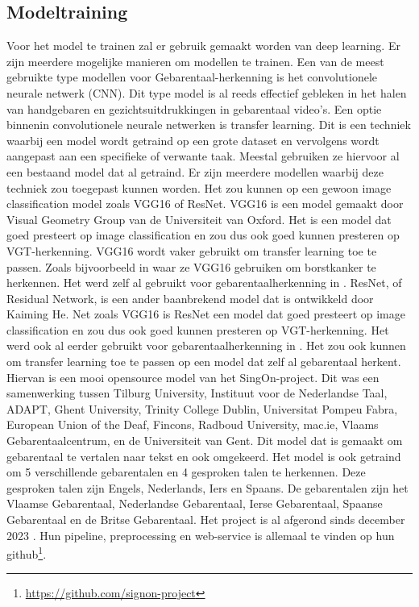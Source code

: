 \subsection{Modeltraining}
\label{subsec:modeltraining}
Voor het model te trainen zal er gebruik gemaakt worden van deep learning.
Er zijn meerdere mogelijke manieren om modellen te trainen. 
Een van de meest gebruikte type modellen voor Gebarentaal-herkenning is het convolutionele neurale netwerk (CNN).
Dit type model is al reeds effectief gebleken in het halen van handgebaren en gezichtsuitdrukkingen in gebarentaal video's\autocite{10.17485/ijst/v16i45.2583}.
Een optie binnenin convolutionele neurale netwerken is transfer learning.
Dit is een techniek waarbij een model wordt getraind op een grote dataset en vervolgens wordt aangepast aan een specifieke of verwante taak\autocite{torrey2010transfer}.
Meestal gebruiken ze hiervoor al een bestaand model dat al getraind.
Er zijn meerdere modellen waarbij deze techniek zou toegepast kunnen worden.
Het zou kunnen op een gewoon image classification model zoals VGG16 of ResNet.
VGG16 is een model gemaakt door Visual Geometry Group van de Universiteit van Oxford.
Het is een model dat goed presteert op image classification en zou dus ook goed kunnen presteren op VGT-herkenning.
VGG16 wordt vaker gebruikt om transfer learning toe te passen.
Zoals bijvoorbeeld in \textcite{9491631} waar ze VGG16 gebruiken om borstkanker te herkennen.
Het werd zelf al gebruikt voor gebarentaalherkenning in \textcite{Abu-Jamie2022-ABUCOS-2}.
ResNet, of Residual Network, is een ander baanbrekend model dat is ontwikkeld door Kaiming He.
Net zoals VGG16 is ResNet een model dat goed presteert op image classification en zou dus ook goed kunnen presteren op VGT-herkenning.
Het werd ook al eerder gebruikt voor gebarentaalherkenning in \textcite{Wang2022}.
Het zou ook kunnen om transfer learning toe te passen op een model dat zelf al gebarentaal herkent.
Hiervan is een mooi opensource model van het SingOn-project\autocite{SingOn}. 
Dit was een samenwerking tussen Tilburg University, Instituut voor de Nederlandse Taal, ADAPT, Ghent University, Trinity College Dublin, Universitat Pompeu Fabra, European Union of the Deaf, Fincons, Radboud University, mac.ie, Vlaams Gebarentaalcentrum, en de Universiteit van Gent.
Dit model dat is gemaakt om gebarentaal te vertalen naar tekst en ook omgekeerd.
Het model is ook getraind om 5 verschillende gebarentalen en 4 gesproken talen te herkennen.
Deze gesproken talen zijn Engels, Nederlands, Iers en Spaans.
De gebarentalen zijn het Vlaamse Gebarentaal, Nederlandse Gebarentaal, Ierse Gebarentaal, Spaanse Gebarentaal en de Britse Gebarentaal.
Het project is al afgerond sinds december 2023 \autocite{shterionov-etal-2024-signon}.
Hun pipeline, preprocessing en web-service is allemaal te vinden op hun github\footnote{\url{https://github.com/signon-project}}.



